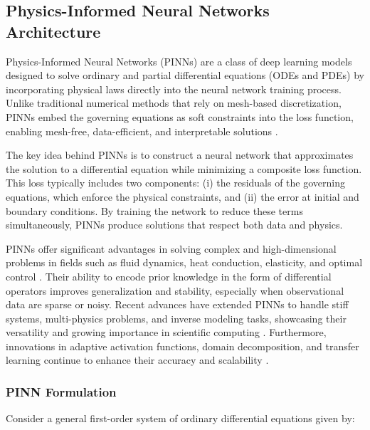 \documentclass[
  number,
  preprint]{elsarticle}
\begin{document}
\subsection{Physics-Informed Neural Networks
Architecture}\label{physics-informed-neural-networks-architecture}

Physics-Informed Neural Networks (PINNs) are a class of deep learning
models designed to solve ordinary and partial differential equations
(ODEs and PDEs) by incorporating physical laws directly into the neural
network training process. Unlike traditional numerical methods that rely
on mesh-based discretization, PINNs embed the governing equations as
soft constraints into the loss function, enabling mesh-free,
data-efficient, and interpretable solutions
\citep{raissi2019physics, karniadakis2021physics}.

The key idea behind PINNs is to construct a neural network that
approximates the solution to a differential equation while minimizing a
composite loss function. This loss typically includes two components:
(i) the residuals of the governing equations, which enforce the physical
constraints, and (ii) the error at initial and boundary conditions. By
training the network to reduce these terms simultaneously, PINNs produce
solutions that respect both data and physics.

PINNs offer significant advantages in solving complex and
high-dimensional problems in fields such as fluid dynamics, heat
conduction, elasticity, and optimal control \citep{cuomo2022scientific}.
Their ability to encode prior knowledge in the form of differential
operators improves generalization and stability, especially when
observational data are sparse or noisy. Recent advances have extended
PINNs to handle stiff systems, multi-physics problems, and inverse
modeling tasks, showcasing their versatility and growing importance in
scientific computing \citep{wang2021understanding, mao2020physics}.
Furthermore, innovations in adaptive activation functions, domain
decomposition, and transfer learning continue to enhance their accuracy
and scalability \citep{mcclenny2020self, shukla2021parallel}.

\subsubsection{PINN Formulation}\label{pinn-formulation}

Consider a general first-order system of ordinary differential equations
given by:
\end{document}
